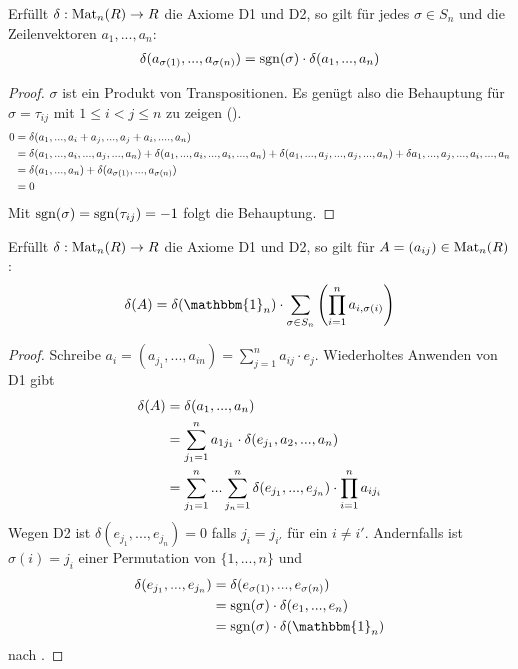 \begin{lemma}
	Erfüllt $\delta:\operatorname{Mat}_n(R) \to R$ die Axiome D1 und D2, so gilt für jedes $\sigma\in S_n$ und die Zeilenvektoren 
	$a_1,...,a_n$: 
	\begin{align}
		\delta(a_{\sigma(1)},...,a_{\sigma(n)})=\operatorname{sgn}(\sigma)\cdot \delta(a_1,...,a_n)\notag
	\end{align}
\end{lemma}
\begin{proof}
	 $\sigma$ ist ein Produkt von Transpositionen. Es genügt also die Behauptung für $\sigma=\tau_{ij}$ mit $1\le i<j\le n$ zu zeigen (). \\
	 \begin{align}
	 	0&=\delta(a_1,...,a_i+a_j,...,a_j+a_i,....,a_n) \notag \\
	 	&=\delta(a_1,...,a_i,...,a_j,...,a_n)+\delta(a_1,...,a_i,...,a_i,...,a_n)+\delta(a_1,...,a_j,
	 	...,a_j,...,a_n)+\delta{a_1,...,a_j,...,a_i,...,a_n} \notag \\
	 	&=\delta(a_1,...,a_n)+\delta(a_{\sigma(1)},...,a_{\sigma(n)}) \notag \\
	 	&=0 \notag
	 \end{align}
	 Mit $\operatorname{sgn}(\sigma)=
	 \operatorname{sgn}(\tau_{ij})=-1$ folgt die Behauptung.
\end{proof}

\begin{lemma}
	Erfüllt $\delta:\operatorname{Mat}_n(R)\to R$ die Axiome D1 und D2, so gilt für $A=(a_{ij})\in \operatorname{Mat}_n(R)$: 
	\begin{align}
		\delta(A)=\delta(\mathbbm{1}_n)
		\cdot \sum_{\sigma\in S_n} \left( \prod_{i=1}^n a_{i,\sigma(i)} \right)\notag
	\end{align}
\end{lemma}
\begin{proof}
	Schreibe $a_i=(a_{j_1},...,a_{in})=\sum_{j=1}^n a_{ij}\cdot e_j$. Wiederholtes Anwenden von D1 gibt 
	\begin{align}
		\delta(A)&=\delta(a_1,...,a_n) \notag \\
		&=\sum_{j_1=1}^n a_{1j_1}\cdot \delta(e_{j_1},a_2,...,a_n) \notag \\
		&=\sum_{j_1=1}^n ... \sum_{j_n=1}^n \delta(e_{j_1},...,e_{j_n})\cdot \prod_{i=1}^n a_{ij_i} \notag
	\end{align}
	Wegen D2 ist $\delta(e_{j_1},...,e_{j_n})=0$ falls $j_i=j_{i'}$ für ein $i\neq i'$. 
	Andernfalls ist $\sigma(i)=j_i$ einer Permutation von $\{1,...,n\}$ und 
	\begin{align}
		\delta(e_{j_1},...,e_{j_n})&=\delta(e_{\sigma(1)},...,e_{\sigma(n)}) \notag \\
		&=\sgn(\sigma)\cdot \delta(e_1,...,e_n) \notag \\
		&=\sgn(\sigma)\cdot \delta(\mathbbm{1}_n) \notag
	\end{align}
	nach .
\end{proof}

